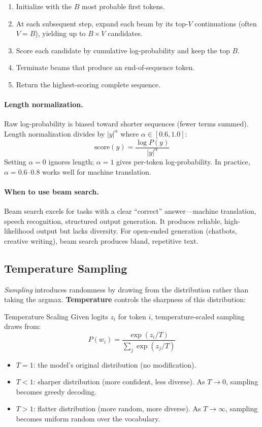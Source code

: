 \begin{enumerate}
    \item Initialize with the $B$ most probable first tokens.
    \item At each subsequent step, expand each beam by its top-$V$ continuations
          (often $V = B$), yielding up to $B \times V$ candidates.
    \item Score each candidate by cumulative log-probability and keep the top $B$.
    \item Terminate beams that produce an end-of-sequence token.
    \item Return the highest-scoring complete sequence.
\end{enumerate}

\paragraph{Length normalization.}
Raw log-probability is biased toward shorter sequences (fewer terms summed).
Length normalization divides by $|y|^\alpha$ where $\alpha \in [0.6, 1.0]$:
\[
    \text{score}(y) = \frac{\log P(y)}{|y|^\alpha}
\]
Setting $\alpha = 0$ ignores length; $\alpha = 1$ gives per-token
log-probability.  In practice, $\alpha = 0.6\text{--}0.8$ works well for
machine translation.

\paragraph{When to use beam search.}
Beam search excels for tasks with a clear ``correct'' answer---machine
translation, speech recognition, structured output generation.  It produces
reliable, high-likelihood output but lacks diversity.  For open-ended generation
(chatbots, creative writing), beam search produces bland, repetitive text.

\subsection{Temperature Sampling}

\emph{Sampling} introduces randomness by drawing from the distribution rather
than taking the argmax.  \textbf{Temperature} controls the sharpness of this
distribution:

\begin{mathresult}{Temperature Scaling}
Given logits $z_i$ for token $i$, temperature-scaled sampling draws from:
\[
    P(w_i) = \frac{\exp(z_i / T)}{\sum_j \exp(z_j / T)}
\]
\begin{itemize}
    \item $T = 1$: the model's original distribution (no modification).
    \item $T < 1$: sharper distribution (more confident, less diverse).
          As $T \to 0$, sampling becomes greedy decoding.
    \item $T > 1$: flatter distribution (more random, more diverse).
          As $T \to \infty$, sampling becomes uniform random over the vocabulary.
\end{itemize}
\end{mathresult}

